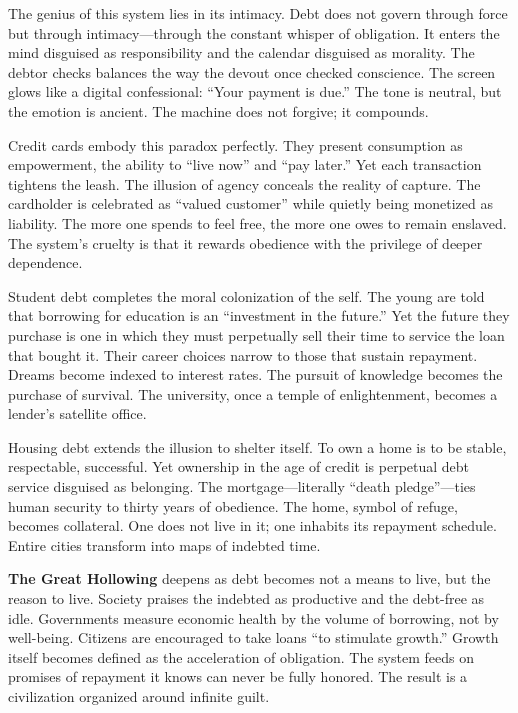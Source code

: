\documentclass[11pt,twoside]{book}
\begin{document}
The genius of this system lies in its intimacy.  Debt does not govern through force but through intimacy—through the constant whisper of obligation.  It enters the mind disguised as responsibility and the calendar disguised as morality.  The debtor checks balances the way the devout once checked conscience.  The screen glows like a digital confessional: “Your payment is due.”  The tone is neutral, but the emotion is ancient.  The machine does not forgive; it compounds.

Credit cards embody this paradox perfectly.  They present consumption as empowerment, the ability to “live now” and “pay later.”  Yet each transaction tightens the leash.  The illusion of agency conceals the reality of capture.  The cardholder is celebrated as “valued customer” while quietly being monetized as liability.  The more one spends to feel free, the more one owes to remain enslaved.  The system’s cruelty is that it rewards obedience with the privilege of deeper dependence.

Student debt completes the moral colonization of the self.  The young are told that borrowing for education is an “investment in the future.”  Yet the future they purchase is one in which they must perpetually sell their time to service the loan that bought it.  Their career choices narrow to those that sustain repayment.  Dreams become indexed to interest rates.  The pursuit of knowledge becomes the purchase of survival.  The university, once a temple of enlightenment, becomes a lender’s satellite office.

Housing debt extends the illusion to shelter itself.  To own a home is to be stable, respectable, successful.  Yet ownership in the age of credit is perpetual debt service disguised as belonging.  The mortgage—literally “death pledge”—ties human security to thirty years of obedience.  The home, symbol of refuge, becomes collateral.  One does not live in it; one inhabits its repayment schedule.  Entire cities transform into maps of indebted time.

\textbf{The Great Hollowing} deepens as debt becomes not a means to live, but the reason to live.  Society praises the indebted as productive and the debt-free as idle.  Governments measure economic health by the volume of borrowing, not by well-being.  Citizens are encouraged to take loans “to stimulate growth.”  Growth itself becomes defined as the acceleration of obligation.  The system feeds on promises of repayment it knows can never be fully honored.  The result is a civilization organized around infinite guilt.
\end{document}
